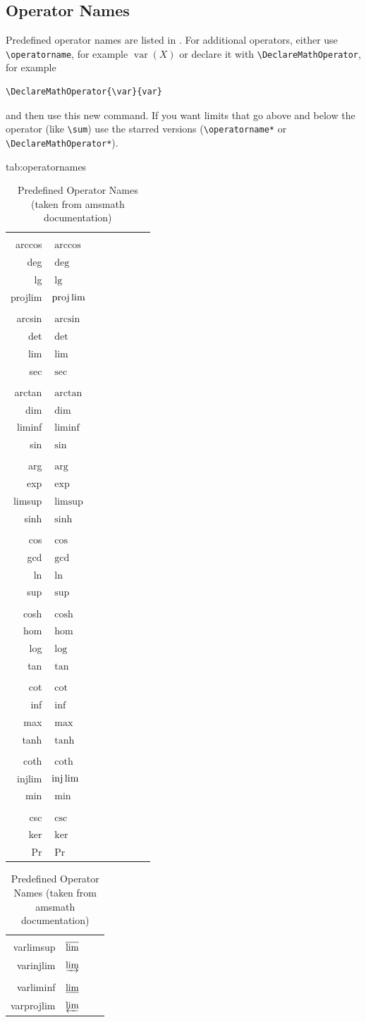 \documentclass[mlabstract]{jmlr}
\newcommand{\cs}[1]{\texttt{\char`\\#1}}
\begin{document}
\subsection{Operator Names}
\label{sec:op}

Predefined operator names are listed in .
For additional operators, either use \verb|\operatorname|,
for example $\operatorname{var}(X)$ or declare it with
\verb|\DeclareMathOperator|, for example
\begin{verbatim}
\DeclareMathOperator{\var}{var}
\end{verbatim}
and then use this new command. If you want limits that go above and
below the operator (like \verb|\sum|) use the starred versions
(\verb|\operatorname*| or \verb|\DeclareMathOperator*|).

\begin{table}[htbp]
\floatconts
  {tab:operatornames}%
  {\caption{Predefined Operator Names (taken from 
   \textsf{amsmath} documentation)}}%
  {%
\begin{tabular}{rlrlrlrl}
\cs{arccos} & $\arccos$ &  \cs{deg} & $\deg$ &  \cs{lg} & $\lg$ &  \cs{projlim} & $\projlim$ \\
\cs{arcsin} & $\arcsin$ &  \cs{det} & $\det$ &  \cs{lim} & $\lim$ &  \cs{sec} & $\sec$ \\
\cs{arctan} & $\arctan$ &  \cs{dim} & $\dim$ &  \cs{liminf} & $\liminf$ &  \cs{sin} & $\sin$ \\
\cs{arg} & $\arg$ &  \cs{exp} & $\exp$ &  \cs{limsup} & $\limsup$ &  \cs{sinh} & $\sinh$ \\
\cs{cos} & $\cos$ &  \cs{gcd} & $\gcd$ &  \cs{ln} & $\ln$ &  \cs{sup} & $\sup$ \\
\cs{cosh} & $\cosh$ &  \cs{hom} & $\hom$ &  \cs{log} & $\log$ &  \cs{tan} & $\tan$ \\
\cs{cot} & $\cot$ &  \cs{inf} & $\inf$ &  \cs{max} & $\max$ &  \cs{tanh} & $\tanh$ \\
\cs{coth} & $\coth$ &  \cs{injlim} & $\injlim$ &  \cs{min} & $\min$ \\
\cs{csc} & $\csc$ &  \cs{ker} & $\ker$ &  \cs{Pr} & $\Pr$
\end{tabular}\par
\begin{tabular}{rlrl}
\cs{varlimsup} & $\varlimsup$ 
& \cs{varinjlim} & $\varinjlim$\\
\cs{varliminf} & $\varliminf$ 
& \cs{varprojlim} & $\varprojlim$
\end{tabular}
}
\end{table}
\end{document}
